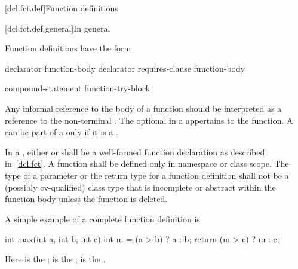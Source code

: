 [dcl.fct.def]{Function definitions}%

[dcl.fct.def.general]{In general}

\pnum
{}%
Function definitions have the form
%
%
\begin{bnf}
\br
      declarator  function-body\br
      declarator requires-clause function-body
\end{bnf}

\begin{bnf}
\br
     compound-statement\br
    function-try-block\br
    \terminal{=}  \terminal{;}\br
    \terminal{=}  \terminal{;}
\end{bnf}

Any informal reference to the body of a function should be interpreted as a reference to
the non-terminal .
The optional  in a 
appertains to the function.
A  can be part of a 
only if it is a .

\pnum
In a ,
either   \tcode{;}
or  \tcode{;}
shall be a well-formed function declaration
as described in~\ref{dcl.fct}.
A function shall be defined only in namespace or class scope.
The type of a parameter or the return type for a function
definition shall not be
a (possibly cv-qualified) class type that is
incomplete or abstract within the function body
unless the function is deleted.

\pnum
\begin{example}
A simple example of a complete function definition is
\begin{codeblock}
int max(int a, int b, int c) {
  int m = (a > b) ? a : b;
  return (m > c) ? m : c;
}
\end{codeblock}

Here
is the
;
is the
;
\tcode{\{ \commentellip{} \}}
is the
.
\end{example}

